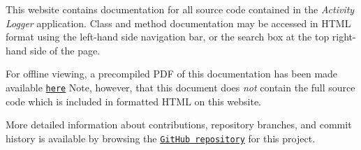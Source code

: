 This website contains documentation for all source code contained in the {\itshape Activity Logger} application. Class and method documentation may be accessed in H\+T\+ML format using the left-\/hand side navigation bar, or the search box at the top right-\/hand side of the page.

For offline viewing, a precompiled P\+DF of this documentation has been made available \href{https://htmlboss.github.io/comp2005-activity-tracker/tex/manual.pdf}{\tt here} Note, however, that this document does {\itshape not} contain the full source code which is included in formatted H\+T\+ML on this website.

More detailed information about contributions, repository branches, and commit history is available by browsing the \href{https://github.com/htmlboss/comp2005-activity-tracker}{\tt Git\+Hub repository} for this project. 